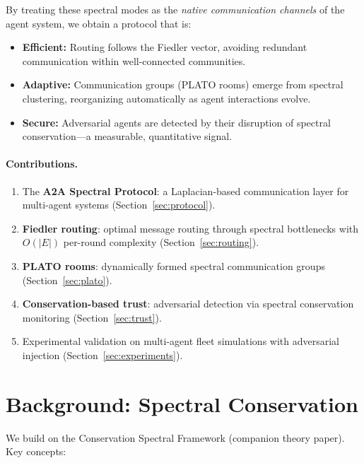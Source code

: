 \documentclass[11pt,a4paper]{article}
\begin{document}
By treating these spectral modes as the \emph{native communication channels}
of the agent system, we obtain a protocol that is:
\begin{itemize}
  \item \textbf{Efficient:} Routing follows the Fiedler vector, avoiding
        redundant communication within well-connected communities.
  \item \textbf{Adaptive:} Communication groups (PLATO rooms) emerge from
        spectral clustering, reorganizing automatically as agent interactions
        evolve.
  \item \textbf{Secure:} Adversarial agents are detected by their disruption
        of spectral conservation---a measurable, quantitative signal.
\end{itemize}

\paragraph{Contributions.}
\begin{enumerate}[leftmargin=*,itemsep=2pt]
  \item The \textbf{A2A Spectral Protocol}: a Laplacian-based communication
        layer for multi-agent systems (Section~\ref{sec:protocol}).
  \item \textbf{Fiedler routing}: optimal message routing through spectral
        bottlenecks with $O(|E|)$ per-round complexity (Section~\ref{sec:routing}).
  \item \textbf{PLATO rooms}: dynamically formed spectral communication groups
        (Section~\ref{sec:plato}).
  \item \textbf{Conservation-based trust}: adversarial detection via spectral
        conservation monitoring (Section~\ref{sec:trust}).
  \item Experimental validation on multi-agent fleet simulations with
        adversarial injection (Section~\ref{sec:experiments}).
\end{enumerate}

\section{Background: Spectral Conservation}
\label{sec:background}

We build on the Conservation Spectral Framework (companion theory paper).  Key
concepts:
\end{document}
